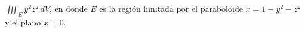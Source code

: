 \item $\iiint_E y^2z^2 \, dV$, en donde $E$ es la región limitada por el paraboloide $x = 1 - y^2 - z^2$ y el plano $x = 0$.

